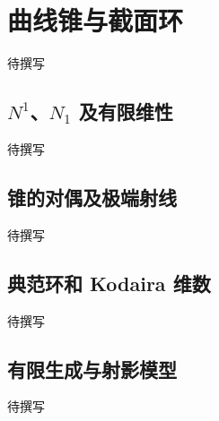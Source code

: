 
% 
% 

\section{曲线锥与截面环}
\label{g5:sec:3002}

待撰写

\subsection{\texorpdfstring{\(N^1\)、\(N_1\) 及有限维性}{N¹、N₁ 及有限维性}}
\label{g5:subsec:3002:01}
待撰写

\subsection{锥的对偶及极端射线}
\label{g5:subsec:3002:02}
待撰写

\subsection{典范环和 Kodaira 维数}
\label{g5:subsec:3002:03}
待撰写

\subsection{有限生成与射影模型}
\label{g5:subsec:3002:04}
待撰写
